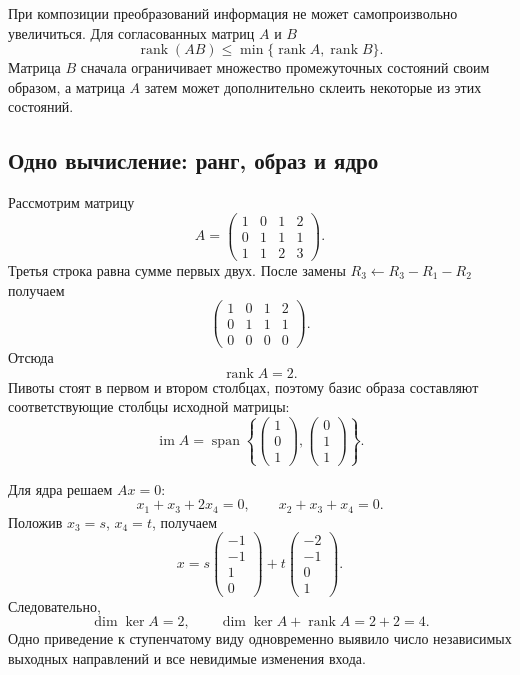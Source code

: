 При композиции преобразований информация не может самопроизвольно увеличиться. Для согласованных матриц \(A\) и \(B\)
\[
\operatorname{rank}(AB)
\leq
\min\{\operatorname{rank}A,\operatorname{rank}B\}.
\]
Матрица \(B\) сначала ограничивает множество промежуточных состояний своим образом, а матрица \(A\) затем может дополнительно склеить некоторые из этих состояний.

\subsection{Одно вычисление: ранг, образ и ядро}

Рассмотрим матрицу
\[
A=
\begin{pmatrix}
1&0&1&2\\
0&1&1&1\\
1&1&2&3
\end{pmatrix}.
\]
Третья строка равна сумме первых двух. После замены
\(R_3\leftarrow R_3-R_1-R_2\) получаем
\[
\begin{pmatrix}
1&0&1&2\\
0&1&1&1\\
0&0&0&0
\end{pmatrix}.
\]
Отсюда
\[
\operatorname{rank}A=2.
\]
Пивоты стоят в первом и втором столбцах, поэтому базис образа составляют соответствующие столбцы исходной матрицы:
\[
\operatorname{im}A
=
\operatorname{span}
\left\{
\begin{pmatrix}1\\0\\1\end{pmatrix},
\begin{pmatrix}0\\1\\1\end{pmatrix}
\right\}.
\]

Для ядра решаем \(Ax=0\):
\[
x_1+x_3+2x_4=0,
\qquad
x_2+x_3+x_4=0.
\]
Положив \(x_3=s\), \(x_4=t\), получаем
\[
x=
 s
\begin{pmatrix}-1\\-1\\1\\0\end{pmatrix}
+t
\begin{pmatrix}-2\\-1\\0\\1\end{pmatrix}.
\]
Следовательно,
\[
\dim\ker A=2,
\qquad
\dim\ker A+\operatorname{rank}A=2+2=4.
\]
Одно приведение к ступенчатому виду одновременно выявило число независимых выходных направлений и все невидимые изменения входа.

